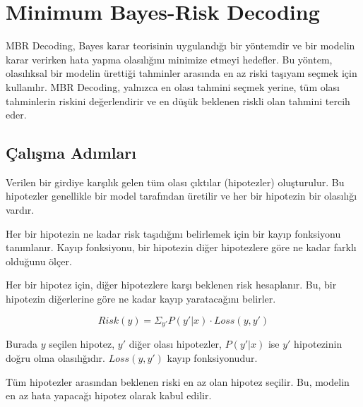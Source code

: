 \section{Minimum Bayes-Risk Decoding}

MBR Decoding, Bayes karar teorisinin uygulandığı bir yöntemdir ve bir modelin karar verirken hata yapma olasılığını minimize etmeyi hedefler. Bu yöntem, olasılıksal bir modelin ürettiği tahminler arasında en az riski taşıyanı seçmek için kullanılır. MBR Decoding, yalnızca en olası tahmini seçmek yerine, tüm olası tahminlerin riskini değerlendirir ve en düşük beklenen riskli olan tahmini tercih eder.

\subsection{Çalışma Adımları}

Verilen bir girdiye karşılık gelen tüm olası çıktılar (hipotezler) oluşturulur. Bu hipotezler genellikle bir model tarafından üretilir ve her bir hipotezin bir olasılığı vardır.

Her bir hipotezin ne kadar risk taşıdığını belirlemek için bir kayıp fonksiyonu tanımlanır. Kayıp fonksiyonu, bir hipotezin diğer hipotezlere göre ne kadar farklı olduğunu ölçer.

Her bir hipotez için, diğer hipotezlere karşı beklenen risk hesaplanır. Bu, bir hipotezin diğerlerine göre ne kadar kayıp yaratacağını belirler.

\[ Risk(y) = \Sigma_{y'}^{} P(y' | x) \cdot Loss(y, y') \]

Burada $y$ seçilen hipotez, $y'$ diğer olası hipotezler, $P(y' | x)$ ise $y'$ hipotezinin doğru olma olasılığıdır. $Loss(y, y')$ kayıp fonksiyonudur.

Tüm hipotezler arasından beklenen riski en az olan hipotez seçilir. Bu, modelin en az hata yapacağı hipotez olarak kabul edilir.

\newpage
